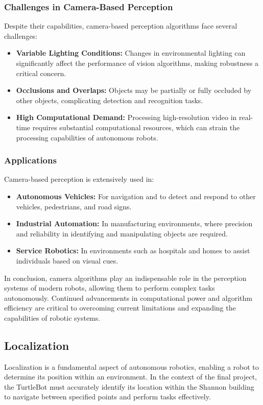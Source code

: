 \documentclass{article}
\begin{document}
	\subsubsection{Challenges in Camera-Based Perception}
	Despite their capabilities, camera-based perception algorithms face several challenges:
	\begin{itemize}
		\item \textbf{Variable Lighting Conditions:} Changes in environmental lighting can significantly affect the performance of vision algorithms, making robustness a critical concern.
		\item \textbf{Occlusions and Overlaps:} Objects may be partially or fully occluded by other objects, complicating detection and recognition tasks.
		\item \textbf{High Computational Demand:} Processing high-resolution video in real-time requires substantial computational resources, which can strain the processing capabilities of autonomous robots.
	\end{itemize}
	
	\subsubsection{Applications}
	Camera-based perception is extensively used in:
	\begin{itemize}
		\item \textbf{Autonomous Vehicles:} For navigation and to detect and respond to other vehicles, pedestrians, and road signs.
		\item \textbf{Industrial Automation:} In manufacturing environments, where precision and reliability in identifying and manipulating objects are required.
		\item \textbf{Service Robotics:} In environments such as hospitals and homes to assist individuals based on visual cues.
	\end{itemize}
	In conclusion, camera algorithms play an indispensable role in the perception systems of modern robots, allowing them to perform complex tasks autonomously. Continued advancements in computational power and algorithm efficiency are critical to overcoming current limitations and expanding the capabilities of robotic systems.
	
	\subsection{Localization}
	Localization is a fundamental aspect of autonomous robotics, enabling a robot to determine its position within an environment. In the context of the final project, the TurtleBot must accurately identify its location within the Shannon building to navigate between specified points and perform tasks effectively.
	
\end{document}
